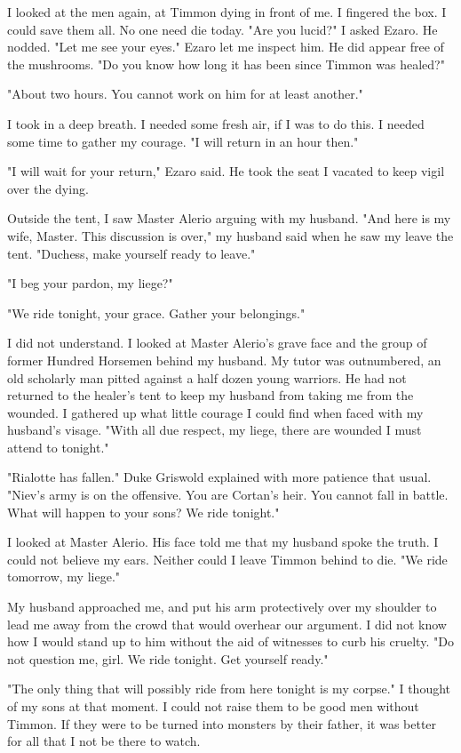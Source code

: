 \documentclass{article}
\begin{document}
I looked at the men again, at Timmon dying in front of me. I fingered the box. I could save them all. No one need die today. "Are you lucid?" I asked Ezaro. He nodded. "Let me see your eyes." Ezaro let me inspect him. He did appear free of the mushrooms. "Do you know how long it has been since Timmon was healed?"

"About two hours. You cannot work on him for at least another."

I took in a deep breath. I needed some fresh air, if I was to do this. I needed some time to gather my courage. "I will return in an hour then."

"I will wait for your return," Ezaro said. He took the seat I vacated to keep vigil over the dying. 

Outside the tent, I saw Master Alerio arguing with my husband. "And here is my wife, Master. This discussion is over," my husband said when he saw my leave the tent. "Duchess, make yourself ready to leave."

"I beg your pardon, my liege?"

"We ride tonight, your grace. Gather your belongings."

I did not understand. I looked at Master Alerio's grave face and the group of former Hundred Horsemen behind my husband. My tutor was outnumbered, an old scholarly man pitted against a half dozen young warriors. He had not returned to the healer's tent to keep my husband from taking me from the wounded. I gathered up what little courage I could find when faced with my husband's visage. "With all due respect, my liege, there are wounded I must attend to tonight."

"Rialotte has fallen." Duke Griswold explained with more patience that usual. "Niev's army is on the offensive. You are Cortan's heir. You cannot fall in battle. What will happen to your sons? We ride tonight."

I looked at Master Alerio. His face told me that my husband spoke the truth. I could not believe my ears. Neither could I leave Timmon behind to die. "We ride tomorrow, my liege."

My husband approached me, and put his arm protectively over my shoulder to lead me away from the crowd that would overhear our argument. I did not know how I would stand up to him without the aid of witnesses to curb his cruelty. "Do not question me, girl. We ride tonight. Get yourself ready."

"The only thing that will possibly ride from here tonight is my corpse." I thought of my sons at that moment. I could not raise them to be good men without Timmon. If they were to be turned into monsters by their father, it was better for all that I not be there to watch. 
\end{document}
